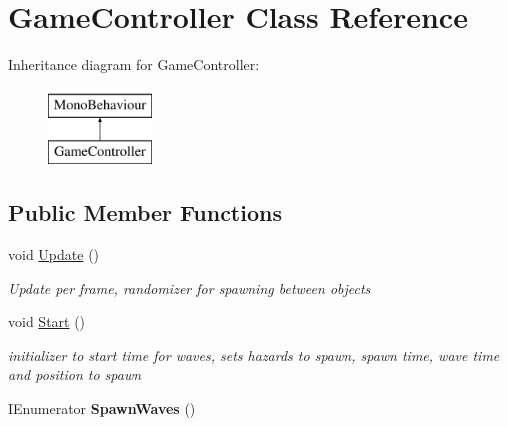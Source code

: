 \hypertarget{classGameController}{\section{Game\-Controller Class Reference}
\label{classGameController}
}
Inheritance diagram for Game\-Controller\-:\begin{figure}[H]
\begin{center}
\leavevmode
\includegraphics[height=2.000000cm]{classGameController}
\end{center}
\end{figure}
\subsection*{Public Member Functions}
\begin{DoxyCompactItemize}
\item 
void \hyperlink{classGameController_a5a89277529cadb49af7d55eba3bbf056}{Update} ()
\begin{DoxyCompactList}\small\item\em Update per frame, randomizer for spawning between objects \end{DoxyCompactList}\item 
void \hyperlink{classGameController_a97788a7aa0f09c8d748781683e5f045b}{Start} ()
\begin{DoxyCompactList}\small\item\em initializer to start time for waves, sets hazards to spawn, spawn time, wave time and position to spawn \end{DoxyCompactList}\item 
\hypertarget{classGameController_ae44bd464d25a837a5651e8633969beaa}{I\-Enumerator {\bfseries Spawn\-Waves} ()}\label{classGameController_ae44bd464d25a837a5651e8633969beaa}

\end{DoxyCompactItemize}
